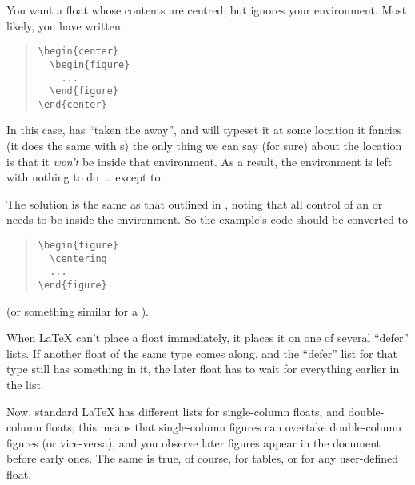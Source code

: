 
You want a float whose contents are centred, but \latex{} ignores your
 environment.  Most likely, you have written:
\begin{quote}
\begin{verbatim}
\begin{center}
  \begin{figure}
    ...
  \end{figure}
\end{center}
\end{verbatim}
\end{quote}
In this case, \latex{} has ``taken the  away'',
and will typeset it at some location it fancies (it does the same with
s) the only thing we can say (for sure) about the
location is that it \emph{won't} be inside that 
environment.  As a result, the  environment is
left with nothing to do~\dots{} except to %
.

The solution is the same as that outlined in %
, noting that all control of
an  or  needs to be
inside the environment.  So the example's code should be converted to
\begin{quote}
\begin{verbatim}
\begin{figure}
  \centering
  ...
\end{figure}
\end{verbatim}
\end{quote}
(or something similar for a ).


When \LaTeX{} can't place a float immediately, it places it on one of
several ``defer'' lists.  If another float of the same type comes
along, and the ``defer'' list for that type still has something in it,
the later float has to wait for everything earlier in the list.

Now, standard \LaTeX{} has different lists for single-column floats,
and double-column floats; this means that single-column figures can
overtake double-column figures (or vice-versa), and you observe later
figures appear in the document before early ones.  The same is true,
of course, for tables, or for any user-defined float.

